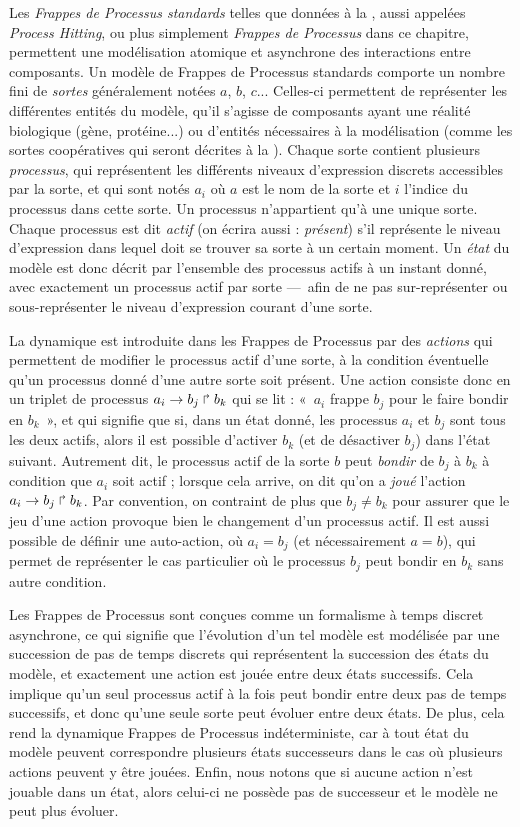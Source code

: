 Les \emph{Frappes de Processus standards} telles que données à la ,
aussi appelées \textit{Process Hitting},
ou plus simplement \emph{Frappes de Processus} dans ce chapitre,
permettent une modélisation atomique et asynchrone des interactions entre composants.
Un modèle de Frappes de Processus standards comporte un nombre fini de \emph{sortes}
généralement notées $a$, $b$, $c$...
Celles-ci permettent de représenter les différentes entités du modèle,
qu'il s'agisse de composants ayant une réalité biologique (gène, protéine...)
ou d'entités nécessaires à la modélisation (comme les sortes coopératives
qui seront décrites à la ).
Chaque sorte contient plusieurs \emph{processus},
qui représentent les différents
niveaux d'expression discrets accessibles par la sorte,
et qui sont notés $a_i$
où $a$ est le nom de la sorte et $i$ l'indice du processus dans cette sorte.
Un processus n'appartient qu'à une unique sorte.
Chaque processus est dit \emph{actif} (on écrira aussi : \emph{présent})
s'il représente le niveau d'expression
dans lequel doit se trouver sa sorte à un certain moment.
Un \emph{état} du modèle est donc décrit par l'ensemble des processus actifs à un instant donné,
avec exactement un processus actif par sorte
---~afin de ne pas sur-représenter ou sous-représenter le niveau d'expression courant d'une sorte.

La dynamique est introduite dans les Frappes de Processus par des \emph{actions}
qui permettent de modifier le processus actif d'une sorte,
à la condition éventuelle qu'un processus donné d'une autre sorte soit présent.
Une action consiste donc en un triplet de processus $a_i\rightarrow b_j\Rsh b_k$
qui se lit : «~$a_i$ frappe $b_j$ pour le faire bondir en $b_k$~»,
et qui signifie que si, dans un état donné, les processus $a_i$ et $b_j$ sont
tous les deux actifs, alors il est possible d'activer $b_k$ (et de désactiver $b_j$)
dans l'état suivant.
Autrement dit, le processus actif de la sorte $b$ peut \emph{bondir}
de $b_j$ à $b_k$ à condition que $a_i$ soit actif ;
lorsque cela arrive, on dit qu'on a \emph{joué} l'action $a_i\rightarrow b_j\Rsh b_k$.
Par convention, on contraint de plus que $b_j \neq b_k$ pour assurer que le jeu d'une action
provoque bien le changement d'un processus actif.
Il est aussi possible de définir une auto-action, où $a_i = b_j$ (et nécessairement $a = b$),
qui permet de représenter le cas particulier où le processus $b_j$ peut bondir en $b_k$
sans autre condition.

Les Frappes de Processus sont conçues comme un formalisme
à temps discret asynchrone, ce qui signifie que
l'évolution d'un tel modèle est modélisée par une succession de pas de temps discrets
qui représentent la succession des états du modèle,
et exactement une action est jouée entre deux états successifs.
Cela implique qu'un seul processus actif à la fois peut bondir entre deux
pas de temps successifs, et donc qu'une seule sorte peut évoluer entre deux états.
De plus, cela rend la dynamique Frappes de Processus indéterministe,
car à tout état du modèle peuvent correspondre plusieurs états successeurs
dans le cas où plusieurs actions peuvent y être jouées.
Enfin, nous notons que si aucune action n'est jouable dans un état, alors celui-ci
ne possède pas de successeur et le modèle ne peut plus évoluer.

